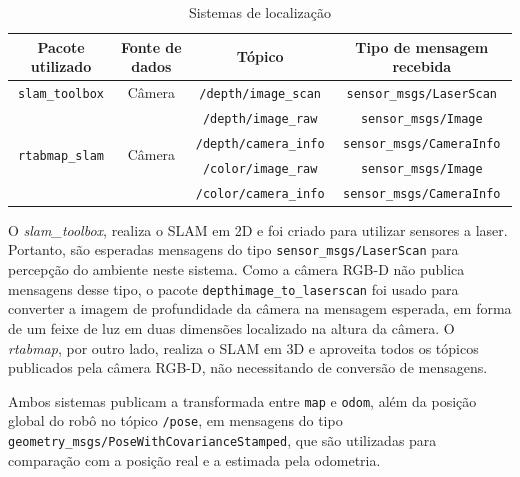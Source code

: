 \documentclass[repeatfields,xlists,xpacks,oneside,yearsonly]{ufrgscca}
\begin{document}
\begin{table}[H]
    \begin{center}
        \caption{Sistemas de localização}
        \label{tab:localizacao}
        \small
        \begin{tabularx}{\linewidth}{c|c|c|c}
            Pacote utilizado                        & Fonte de dados          & Tópico                       & Tipo de mensagem recebida        \\
            \hline
            \texttt{slam\_toolbox}                  & Câmera                  & \texttt{/depth/image\_scan}  & \texttt{sensor\_msgs/LaserScan}  \\
            \hline
            \multirow{4}{*}{\texttt{rtabmap\_slam}} & \multirow{4}{*}{Câmera} & \texttt{/depth/image\_raw}   & \texttt{sensor\_msgs/Image}      \\
                                                    &                         & \texttt{/depth/camera\_info} & \texttt{sensor\_msgs/CameraInfo} \\
                                                    &                         & \texttt{/color/image\_raw}   & \texttt{sensor\_msgs/Image}      \\
                                                    &                         & \texttt{/color/camera\_info} & \texttt{sensor\_msgs/CameraInfo} \\
        \end{tabularx}
    \end{center}
\end{table}

O \textit{slam\_toolbox}, realiza o SLAM em 2D e foi criado para
utilizar sensores a laser. Portanto, são esperadas mensagens do tipo
\texttt{sensor\_msgs/LaserScan} para percepção do ambiente neste
sistema. Como a câmera RGB-D não publica mensagens desse tipo, o
pacote \texttt{depthimage\_to\_laserscan} foi usado para converter a
imagem de profundidade da câmera na mensagem esperada, em forma de um
feixe de luz em duas dimensões localizado na altura da câmera. O
\textit{rtabmap}, por outro lado, realiza o SLAM em 3D e aproveita
todos os tópicos publicados pela câmera RGB-D, não necessitando de
conversão de mensagens.

Ambos sistemas publicam a transformada entre \texttt{map} e
\texttt{odom}, além da posição global do robô no tópico
\texttt{/pose}, em mensagens do tipo
\texttt{geometry\_msgs/PoseWithCovarianceStamped}, que são utilizadas
para comparação com a posição real e a estimada pela odometria.
\end{document}
